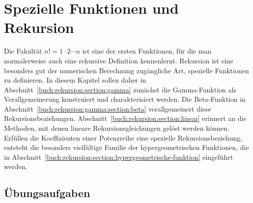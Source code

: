 %
%
%
\chapter{Spezielle Funktionen und Rekursion
\label{buch:chapter:rekursion}}
Die Fakultät $n!=1\cdot 2\cdots n$ ist eine der ersten Funktionen, für die
man normalerweise auch eine rekursive Definition kennenlernt.
Rekursion ist eine besonders gut der numerischen Berechnung zugängliche
Art, spezielle Funktionen zu definieren.
In diesem Kapitel sollen daher in
Abschnitt~\ref{buch:rekursion:section:gamma}
zunächst die Gamma-Funktion als Verallgemeinerung konstruiert
und charakterisiert werden.
Die Beta-Funktion in
Abschnitt~\ref{buch:rekursion:gamma:section:beta}
verallgemeinert diese Rekursionsbeziehungen.
Abschnitt~\ref{buch:rekursion:section:linear}
erinnert an die Methoden, mit denen lineare Rekursionsgleichungen
gelöst werden können. 
Erfüllen die Koeffizienten einer Potenzreihe eine spezielle
Rekursionsbeziehung, entsteht die besonders vielfältige Familie
der hypergeometrischen Funktionen, die in
Abschnitt~\ref{buch:rekursion:section:hypergeometrische-funktion}
eingeführt werden.






\section*{Übungsaufgaben}
\begin{uebungsaufgaben}
\end{uebungsaufgaben}

